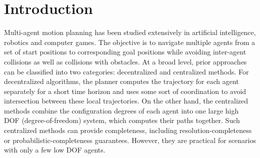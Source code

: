 \section{Introduction}
Multi-agent motion planning has been studied extensively in artificial intelligence, robotics and computer games.
The objective is to navigate multiple agents from a set of start positions to corresponding goal positions while avoiding inter-agent collisions as well as collisions with obstacles.
At a broad level, prior approaches can be classified into two categories: decentralized and centralized methods. 
For decentralized algorithms, the planner computes the trajectory for each agent separately for a short time horizon and uses some sort of coordination to avoid intersection between these local trajectories. On the other hand, the centralized methods combine the configuration degrees of each agent into one large high DOF (degree-of-freedom) system, which computes their paths together. Such centralized methods can provide completeness, including resolution-completeness or probabilistic-completeness guarantees. However, they are practical for scenarios with only a few low DOF agents.

